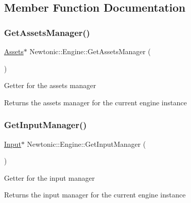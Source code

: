 \subsection{Member Function Documentation}
\mbox{\label{classNewtonic_1_1Engine_abb99a60c574e6a2c59ddb9519d19e1a1}} 
\subsubsection{\texorpdfstring{GetAssetsManager()}{GetAssetsManager()}}
{\footnotesize\ttfamily \mbox{\hyperlink{classNewtonic_1_1Assets}{Assets}}$\ast$ Newtonic\+::\+Engine\+::\+Get\+Assets\+Manager (\begin{DoxyParamCaption}{ }\end{DoxyParamCaption})\hspace{0.3cm}{\ttfamily [inline]}}

Getter for the assets manager \begin{DoxyReturn}{Returns}
the assets manager for the current engine instance 
\end{DoxyReturn}
\mbox{\label{classNewtonic_1_1Engine_a119890a520ef63c013c6bd2f34876797}} 
\subsubsection{\texorpdfstring{GetInputManager()}{GetInputManager()}}
{\footnotesize\ttfamily \mbox{\hyperlink{classNewtonic_1_1Input}{Input}}$\ast$ Newtonic\+::\+Engine\+::\+Get\+Input\+Manager (\begin{DoxyParamCaption}{ }\end{DoxyParamCaption})\hspace{0.3cm}{\ttfamily [inline]}}

Getter for the input manager \begin{DoxyReturn}{Returns}
the input manager for the current engine instance 
\end{DoxyReturn}
\mbox{\label{classNewtonic_1_1Engine_ac487e72315c9a328548c9a77966e50db}} 
